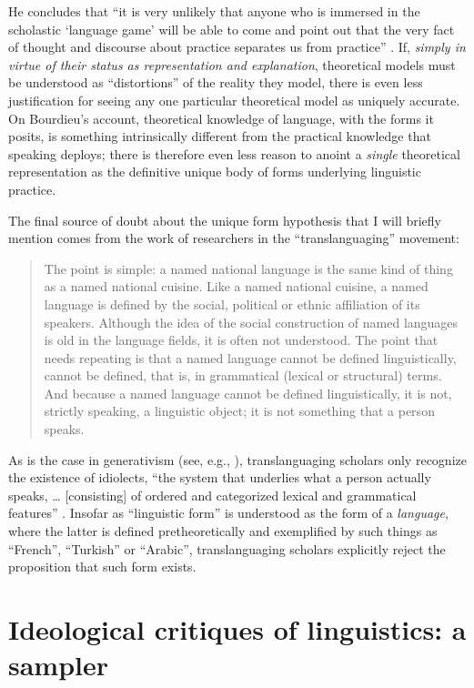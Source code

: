 \documentclass[output=paper]{langscibook}
\begin{document}
\noindent He concludes that ``it is very unlikely that anyone who is immersed in the scholastic `language game' will be able to come and point out that the very fact of thought and discourse about practice separates us from practice'' \citep[52]{Bourdieu20031997}. If, \emph{simply in virtue of their status as representation and explanation}, theoretical models must be understood as ``distortions'' of the reality they model, there is even less justification for seeing any one particular theoretical model as uniquely accurate. On Bourdieu's account, theoretical knowledge of language, with the forms it posits, is something intrinsically different from the practical knowledge that speaking deploys; there is therefore even less reason to anoint a \emph{single} theoretical representation as the definitive unique body of forms underlying linguistic practice.

The final source of doubt about the unique form hypothesis that I will briefly mention comes from the work of researchers in the ``translanguaging'' movement:

\begin{quotation}
The point is simple: a named national language is the same kind of thing as a named national cuisine. Like a named national cuisine, a named language is defined by the social, political or ethnic affiliation of its speakers. Although the idea of the social construction of named languages is old in the language fields, it is often not understood. The point that needs repeating is that a named language cannot be defined linguistically, cannot be defined, that is, in grammatical (lexical or structural) terms. And because a named language cannot be defined linguistically, it is not, strictly speaking, a linguistic object; it is not something that a person speaks. \citep[286]{OtheguyReid2015}
\end{quotation}

\noindent As is the case in generativism (see, e.g., \citealt{Chomsky2000horizons}), translanguaging scholars only recognize the existence of idiolects, ``the system that underlies what a person actually speaks, … [consisting] of ordered and categorized lexical and grammatical features'' \citep[289]{OtheguyReid2015}. Insofar as ``linguistic form'' is understood as the form of a \emph{language}, where the latter is defined pretheoretically and exemplified by such things as ``French'', ``Turkish'' or ``Arabic'', translanguaging scholars explicitly reject the proposition that such form exists.

\section{Ideological critiques of linguistics: a sampler}
\label{sec:riemer:ideologicalcritiques}
\end{document}
